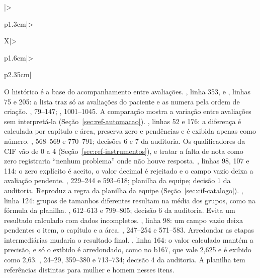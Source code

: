 \begin{apendicesenv}
{\begin{xltabular}{\textwidth}{|>{\raggedright\arraybackslash}p{1.3cm}|>{\raggedright\arraybackslash}X|>{\raggedright\arraybackslash}p{1.6cm}|>{\raggedright\arraybackslash}p{2.35cm}|}
		{O histórico é a base do acompanhamento entre avaliações.}
		{, linha 353, e , linhas 75 e 205: a lista traz só as
		avaliações do paciente e as numera pela ordem de criação.}
		{, 79--147; , 1001--1045.}
		{A comparação mostra a variação entre avaliações sem interpretá-la (Seção~\ref{sec:ref-automacao}).}
		{, linhas 52 e 176: a diferença é calculada por capítulo e área, preserva zero e
		pendências e é exibida apenas como número.}
		{, 568--569 e 770--791; decisões 6 e 7 da auditoria.}
		{Os qualificadores da CIF vão de 0 a 4 (Seção~\ref{sec:ref-instrumentos}), e tratar a falta de nota como zero
		registraria ``nenhum problema'' onde não houve resposta.}
		{, linhas 98, 107 e 114: o zero explícito é aceito, o valor decimal é rejeitado e o
		campo vazio deixa a avaliação pendente.}
		{, 229--244 e 593--618; planilha da equipe; decisão 1 da auditoria.}
		{Reproduz a regra da planilha da equipe (Seção~\ref{sec:cif-catalogo}).}
		{, linha 124: grupos de tamanhos diferentes resultam na média dos grupos, como na
		fórmula da planilha.}
		{, 612--613 e 799--805; decisão 6 da auditoria.}
		{Evita um resultado calculado com dados incompletos.}
		{, linha 98: um campo vazio deixa pendentes o item, o capítulo e a área.}
		{, 247--254 e 571--583.}
		{Arredondar as etapas intermediárias mudaria o resultado final.}
		{, linha 164: o valor calculado mantém a precisão, e só o exibido é arredondado, como
		no b167, que vale 2,625 e é exibido como 2,63.}
		{, 24--29, 359--380 e 713--734; decisão 4 da auditoria.}
		{A planilha tem referências distintas para mulher e homem nesses itens.}

\end{xltabular}}
\end{apendicesenv}
